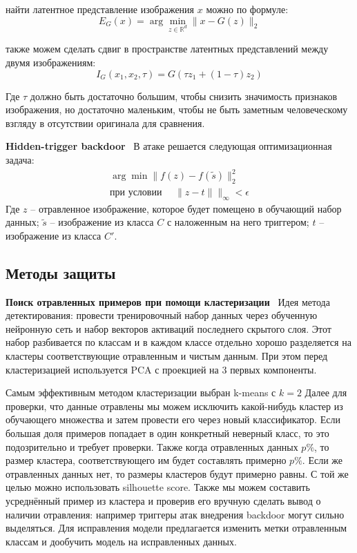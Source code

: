  найти латентное представление изображения $x$ можно по формуле:
$$E_{G}(x)=\arg \min _{z \in \mathbb{R}^{d}}\|x-G(z)\|_{2}$$

 также можем сделать сдвиг в пространстве латентных представлений между двумя изображениям:
$$I_{G}\left(x_{1}, x_{2}, \tau\right)=G\left(\tau z_{1}+(1-\tau) z_{2}\right)$$

Где $\tau$ должно быть достаточно большим, чтобы снизить значимость признаков изображения, но достаточно маленьким, чтобы не быть заметным человеческому взгляду в отсутствии оригинала для сравнения.


\textbf{Hidden-trigger backdoor}~\cite{HiddenTrigger}
В атаке решается следующая оптимизационная задача:
$$
\begin{array}{r}
\arg \min \|f(z)-f(\tilde{s})\|_{2}^{2} \\
\text{при условии~} \quad\|z-t\| \|_{\infty}<\epsilon
\end{array}
$$
Где $z$ – отравленное изображение, которое будет помещено в обучающий набор данных; $\tilde{s}$ – изображение из класса $C$ с наложенным на него триггером; $t$ – изображение из класса $C'$.


\subsection*{Методы защиты}
\textbf{Поиск отравленных примеров при помощи кластеризации}~\cite{chen_detecting_2018}
Идея метода детектирования: провести тренировочный набор данных через
обученную нейронную сеть и набор векторов активаций последнего скрытого
слоя. Этот набор разбивается по классам и в каждом классе отдельно хорошо
разделяется на кластеры соответствующие отравленным и чистым данным.
При этом перед кластеризацией используется PCA с проекцией на 3 первых
компоненты.

Самым эффективным методом кластеризации выбран k-means с $k=2$ Далее для проверки, что данные отравлены мы можем исключить какой-нибудь
кластер из обучающего множества и затем провести его через новый классификатор. Если большая доля примеров попадает в один конкретный неверный
класс, то это подозрительно и требует проверки.
Также когда отравленных данных $p\%$, то размер кластера, соответствующего им будет составлять примерно $p\%$. Если же отравленных данных нет,
то размеры кластеров будут примерно равны. С той же целью можно использовать silhouette score.
Также мы можем составить усреднённый пример из кластера и проверив его вручную сделать вывод о наличии отравления: например триггеры атак внедрения backdoor могут сильно выделяться.
Для исправления модели предлагается изменить метки отравленным
классам и дообучить модель на исправленных данных.

